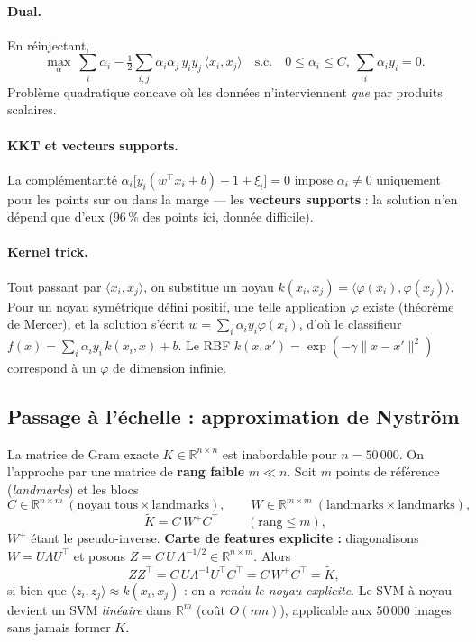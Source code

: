 \documentclass[11pt,a4paper]{article}
\newcommand{\R}{\mathbb{R}}
\newcommand{\norm}[1]{\lVert #1 \rVert}
\newcommand{\inner}[2]{\langle #1, #2\rangle}
\newcommand{\T}{^{\top}}
\begin{document}
\paragraph{Dual.} En réinjectant,
\begin{equation}
\max_{\alpha}\ \sum_i\alpha_i-\tfrac12\sum_{i,j}\alpha_i\alpha_j\,y_iy_j\,
\inner{x_i}{x_j}
\quad\text{s.c.}\quad 0\le\alpha_i\le C,\ \sum_i\alpha_i y_i=0 .
\end{equation}
Problème quadratique concave où les données n'interviennent \emph{que} par
produits scalaires.
\paragraph{KKT et vecteurs supports.} La complémentarité
$\alpha_i\big[y_i(w\T x_i+b)-1+\xi_i\big]=0$ impose $\alpha_i\neq0$ uniquement pour
les points sur ou dans la marge — les \textbf{vecteurs supports} : la solution
n'en dépend que d'eux (96\,\% des points ici, donnée difficile).
\paragraph{Kernel trick.} Tout passant par $\inner{x_i}{x_j}$, on substitue un
noyau $k(x_i,x_j)=\inner{\varphi(x_i)}{\varphi(x_j)}$. Pour un noyau symétrique
défini positif, une telle application $\varphi$ existe (théorème de Mercer), et la
solution s'écrit $w=\sum_i\alpha_i y_i\varphi(x_i)$, d'où le classifieur
$f(x)=\sum_i\alpha_i y_i\,k(x_i,x)+b$. Le RBF
$k(x,x')=\exp(-\gamma\norm{x-x'}^2)$ correspond à un $\varphi$ de dimension
infinie.

\subsection{Passage à l'échelle : approximation de Nyström}\label{sec:nystrom}
La matrice de Gram exacte $K\in\R^{n\times n}$ est inabordable pour $n=50\,000$.
On l'approche par une matrice de \textbf{rang faible} $m\ll n$. Soit $m$ points de
référence (\emph{landmarks}) et les blocs
\[
C\in\R^{n\times m}\ (\text{noyau tous}\times\text{landmarks}),\qquad
W\in\R^{m\times m}\ (\text{landmarks}\times\text{landmarks}),
\]
\begin{equation}
\boxed{\ \tilde K = C\,W^{+}C\T\ }\qquad(\text{rang}\le m),
\end{equation}
$W^{+}$ étant le pseudo-inverse. \textbf{Carte de features explicite :}
diagonalisons $W=U\Lambda U\T$ et posons $Z=C\,U\,\Lambda^{-1/2}\in\R^{n\times m}$.
Alors
\begin{equation}
ZZ\T = C\,U\Lambda^{-1}U\T C\T = C\,W^{+}C\T = \tilde K ,
\end{equation}
si bien que $\inner{z_i}{z_j}\approx k(x_i,x_j)$ : on a \emph{rendu le noyau
explicite}. Le SVM à noyau devient un SVM \emph{linéaire} dans $\R^{m}$ (coût
$O(nm)$), applicable aux $50\,000$ images sans jamais former $K$.
\end{document}
